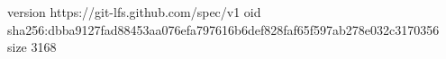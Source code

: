 version https://git-lfs.github.com/spec/v1
oid sha256:dbba9127fad88453aa076efa797616b6def828faf65f597ab278e032c3170356
size 3168
